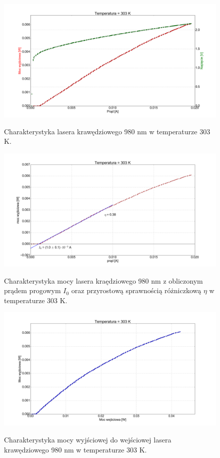 \documentclass[a4paper, portrait,12pt]{report}
\begin{document}
\begin{figure}
\center
  \includegraphics[scale=0.30]{plot980/temp_30_IVL.png}
  \label{rys1}
  \caption{Charakterystyka lasera krawędziowego 980 nm w temperaturze 303 K.} 
\end{figure}

\begin{figure}
\center
  \includegraphics[scale=0.30]{plot980/temp_30_fit.png}
  \label{rys1}
  \caption{Charakterystyka mocy lasera kraędziowego 980 nm z obliczonym prądem progowym $I_0$ oraz przyrostową sprawnością różniczkową $\eta$ w temperaturze 303 K.} 
\end{figure}

\begin{figure}
\center
  \includegraphics[scale=0.30]{plot980/temp_30_power.png}
  \label{rys1}
  \caption{Charakterystyka mocy wyjściowej do wejściowej lasera krawędziowego 980 nm w temperaturze 303 K.} 
\end{figure}
\end{document}

